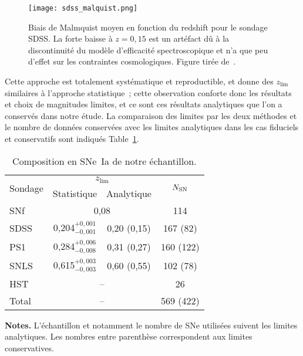 \documentclass[../main/main.tex]{subfiles}
\begin{document}
\begin{SCfigure}[0,7]
    \centering
    \texttt{[image: sdss\_malquist.png]}
    \caption[Biais de Malmquist moyen en fonction du redshift pour le sondage
    SDSS.]{Biais de Malmquist moyen en fonction du redshift pour le sondage
        SDSS. La forte baisse à $z=0,15$ est un artéfact dû à la discontinuité
        du modèle d'efficacité spectroscopique et n'a que peu d'effet sur les
    contraintes cosmologiques. Figure tirée de~\cite{conley2011}.}
    \label{fig:sdssmalm}
\end{SCfigure}

Cette approche est totalement systématique et reproductible, et donne des
$z_{\lim}$ similaires à l'approche statistique~; cette observation conforte donc
les résultats et choix de magnitudes limites, et ce sont ces résultats
analytiques que l'on a conservés dans notre étude. La comparaison des limites
par les deux méthodes et le nombre de données conservées avec les limites
analytiques dans les cas fiduciels et conservatifs sont indiqués
Table~\ref{tab:zlimsample}.

\begin{table}[ht]
    \centering
    \begin{threeparttable}
        \caption{Composition en SNe~Ia de notre échantillon.}
        \label{tab:zlimsample}
        \begin{tabular}{lccc}
            \toprule
            \multirow{2}[2]{*}{Sondage} &
            \multicolumn{2}{c}{$z_{\lim}$} &
            \multirow{2}[2]{*}{$N_{\rm SN}$}\\
            \cmidrule(lr){2-3}
            & Statistique & Analytique & \\
            \midrule
            SNf &
            \multicolumn{2}{c}{0,08} &
            114 \\
            SDSS & 
            0,204$^{+0,001}_{-0,001}$ & 0,20 (0,15) &
            167 (82) \\
            PS1 &
            0,284$^{+0,006}_{-0,008}$ & 0,31 (0,27) &
            160 (122) \\
            SNLS &
            0,615$^{+0,003}_{-0,003}$ & 0,60 (0,55) &
            102 (78) \\
            HST &
            \multicolumn{2}{c}{--} &
            26 \\
            \midrule
            Total & \multicolumn{2}{c}{--} &
            569 (422)\\
            \bottomrule
        \end{tabular}
        \begin{tablenotes}[flushleft]
        \item \textbf{\hspace{-3,2pt}Notes.} L'échantillon et notamment le
            nombre de SNe utilisées suivent les limites analytiques. Les nombres
            entre parenthèse correspondent aux limites conservatives.
        \end{tablenotes}
    \end{threeparttable}
\end{table}
\end{document}
